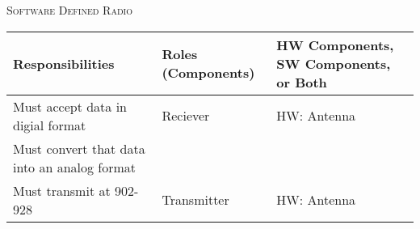 \documentclass[RRC.tex]{subfiles}
\begin{document}
\bigskip

\begin{center}
	\textsc{\Large Software Defined Radio}
	\hrulefill
	\begin{tabular}{ | p{5cm} | p{5cm} | p{5cm} |}
		\hline
		Responsibilities & Roles (Components) & HW Components, SW Components, or Both \\ \hline
		Must accept data in digial format & Reciever & HW: Antenna \\ \hline
		Must convert that data into an analog format & &  \\ \hline
		Must transmit at 902-928 & Transmitter & HW: Antenna \\ \hline
		
		
		
	\end{tabular}
\end{center}
\end{document}
